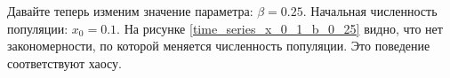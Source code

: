     Давайте теперь изменим значение параметра: \(\beta = 0.25\). Начальная численность популяции: \(x_0 = 0.1\). На рисунке \ref{time_series_x_0_1_b_0_25} видно, что нет закономерности, по которой меняется численность популяции. Это поведение соответствуют хаосу.
    

